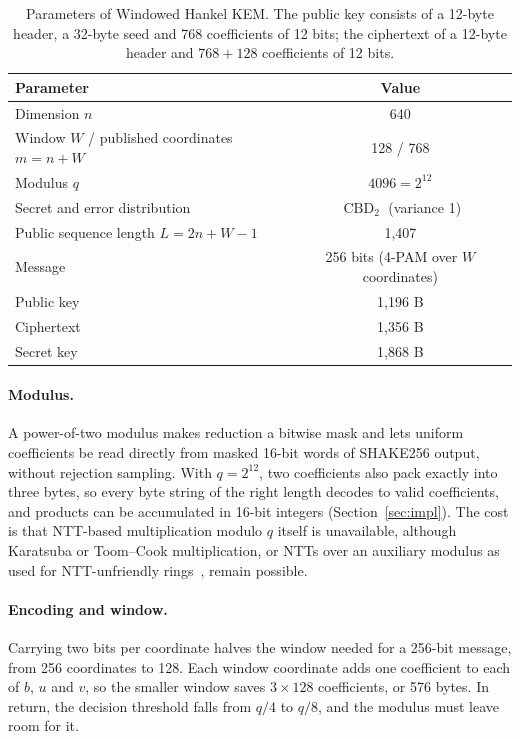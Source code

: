 \documentclass[11pt,a4paper]{article}
\theoremstyle{definition}
\newcommand{\CBD}{\operatorname{CBD}}
\begin{document}
\begin{table}[H]
\centering
\begin{tabular}{lc}
\toprule
Parameter & Value \\
\midrule
Dimension $n$ & 640 \\
Window $W$ / published coordinates $m = n + W$ & 128 / 768 \\
Modulus $q$ & $4096 = 2^{12}$ \\
Secret and error distribution & $\CBD_2$ (variance 1) \\
Public sequence length $L = 2n + W - 1$ & 1{,}407 \\
Message & 256 bits (4-PAM over $W$ coordinates) \\
\midrule
Public key & 1{,}196 B \\
Ciphertext & 1{,}356 B \\
Secret key & 1{,}868 B \\
\bottomrule
\end{tabular}
\caption{Parameters of Windowed Hankel KEM. The public key consists of a 12-byte header, a 32-byte seed and 768 coefficients of 12 bits; the ciphertext of a 12-byte header and $768 + 128$ coefficients of 12 bits.}
\label{tab:params}
\end{table}

\paragraph{Modulus.} A power-of-two modulus makes reduction a bitwise mask and lets uniform coefficients be read directly from masked 16-bit words of SHAKE256 output, without rejection sampling. With $q = 2^{12}$, two coefficients also pack exactly into three bytes, so every byte string of the right length decodes to valid coefficients, and products can be accumulated in 16-bit integers (Section~\ref{sec:impl}). The cost is that NTT-based multiplication modulo $q$ itself is unavailable, although Karatsuba or Toom--Cook multiplication, or NTTs over an auxiliary modulus as used for NTT-unfriendly rings~\cite{chung2021ntt}, remain possible.

\paragraph{Encoding and window.} Carrying two bits per coordinate halves the window needed for a 256-bit message, from 256 coordinates to 128. Each window coordinate adds one coefficient to each of $b$, $u$ and $v$, so the smaller window saves $3 \times 128$ coefficients, or 576 bytes. In return, the decision threshold falls from $q/4$ to $q/8$, and the modulus must leave room for it.
\end{document}
